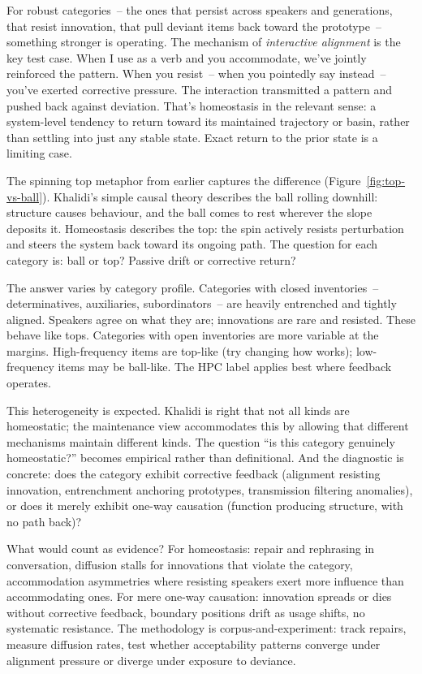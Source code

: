 For robust categories~-- the ones that persist across speakers and generations, that resist innovation, that pull deviant items back toward the prototype~-- something stronger is operating. The mechanism of \emph{interactive alignment} is the key test case. When I use  as a verb and you accommodate, we've jointly reinforced the pattern. When you resist~-- when you pointedly say  instead~-- you've exerted corrective pressure. The interaction transmitted a pattern and pushed back against deviation. That's homeostasis in the relevant sense: a system-level tendency to return toward its maintained trajectory or basin, rather than settling into just any stable state. Exact return to the prior state is a limiting case.

The spinning top metaphor from earlier captures the difference (Figure~\ref{fig:top-vs-ball}). Khalidi's simple causal theory describes the ball rolling downhill: structure causes behaviour, and the ball comes to rest wherever the slope deposits it. Homeostasis describes the top: the spin actively resists perturbation and steers the system back toward its ongoing path. The question for each category is: ball or top? Passive drift or corrective return?

The answer varies by category profile. Categories with closed inventories~-- determinatives, auxiliaries, subordinators~-- are heavily entrenched and tightly aligned. Speakers agree on what they are; innovations are rare and resisted. These behave like tops. Categories with open inventories are more variable at the margins. High-frequency items are top-like (try changing how  works); low-frequency items may be ball-like. The HPC label applies best where feedback operates.

This heterogeneity is expected. Khalidi is right that not all kinds are homeostatic; the maintenance view accommodates this by allowing that different mechanisms maintain different kinds. The question \enquote{is this category genuinely homeostatic?} becomes empirical rather than definitional. And the diagnostic is concrete: does the category exhibit corrective feedback (alignment resisting innovation, entrenchment anchoring prototypes, transmission filtering anomalies), or does it merely exhibit one-way causation (function producing structure, with no path back)?

What would count as evidence? For homeostasis: repair and rephrasing in conversation, diffusion stalls for innovations that violate the category, accommodation asymmetries where resisting speakers exert more influence than accommodating ones. For mere one-way causation: innovation spreads or dies without corrective feedback, boundary positions drift as usage shifts, no systematic resistance. The methodology is corpus-and-experiment: track repairs, measure diffusion rates, test whether acceptability patterns converge under alignment pressure or diverge under exposure to deviance.

